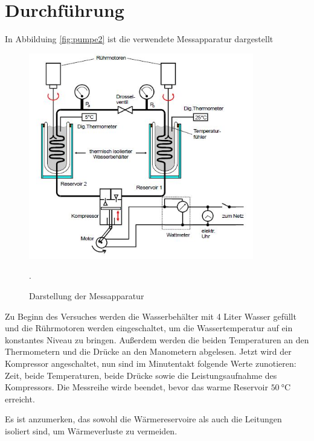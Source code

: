 \section{Durchführung}
In Abbilduing \ref{fig:pumpe2} ist die verwendete Messapparatur dargestellt
\begin{figure}[H]
  \centering
  \includegraphics[height=9cm]{pumpe2.JPG}
  \caption{Darstellung der Messapparatur}
  \cite{skript}.
  \label{pumpe2}
\end{figure}

Zu Beginn des Versuches werden die Wasserbehälter mit 4 Liter Wasser gefüllt und
die Rührmotoren werden eingeschaltet, um die Wassertemperatur auf ein konstantes
Niveau zu bringen. Außerdem werden die beiden Temperaturen an den Thermometern und die Drücke an den Manometern abgelesen.
Jetzt wird der Kompressor angeschaltet, nun sind im Minutentakt folgende Werte zunotieren:
Zeit, beide Temperaturen, beide Drücke sowie die Leistungsaufnahme des Kompressors.
Die Messreihe wirde beendet, bevor das warme Reservoir $\SI{50}{\celsius}$ erreicht.

Es ist anzumerken, das sowohl die Wärmereservoire als auch die Leitungen isoliert sind,
um Wärmeverluste zu vermeiden.


\label{sec:Durchführung}
